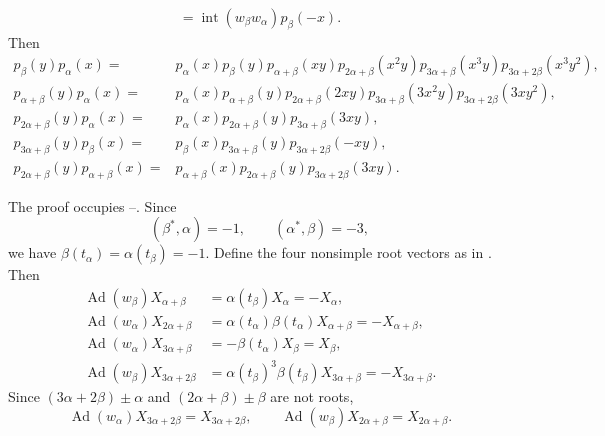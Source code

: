 {\begin{enumerate}
\[\begin{aligned}
          =\operatorname{int}(w_\beta w_\alpha)p_\beta(-x).
    \end{aligned}
    \]
    Then
    \[
    \begin{aligned}
      p_\beta(y)p_\alpha(x)
        ={}&p_\alpha(x)p_\beta(y)p_{\alpha+\beta}(xy)
          p_{2\alpha+\beta}(x^2y)p_{3\alpha+\beta}(x^3y)
          p_{3\alpha+2\beta}(x^3y^2),\\
      p_{\alpha+\beta}(y)p_\alpha(x)
        ={}&p_\alpha(x)p_{\alpha+\beta}(y)
          p_{2\alpha+\beta}(2xy)p_{3\alpha+\beta}(3x^2y)
          p_{3\alpha+2\beta}(3xy^2),\\
      p_{2\alpha+\beta}(y)p_\alpha(x)
        ={}&p_\alpha(x)p_{2\alpha+\beta}(y)
          p_{3\alpha+\beta}(3xy),\\
      p_{3\alpha+\beta}(y)p_\beta(x)
        ={}&p_\beta(x)p_{3\alpha+\beta}(y)
          p_{3\alpha+2\beta}(-xy),\\
      p_{2\alpha+\beta}(y)p_{\alpha+\beta}(x)
        ={}&p_{\alpha+\beta}(x)p_{2\alpha+\beta}(y)
          p_{3\alpha+2\beta}(3xy).
    \end{aligned}
    \]
\end{enumerate}}

The proof occupies --. Since
\[
  (\beta^*,\alpha)=-1,\qquad(\alpha^*,\beta)=-3,
\]
we have \(\beta(t_\alpha)=\alpha(t_\beta)=-1\). Define the four
nonsimple root vectors as in . Then
\[
\begin{aligned}
  \operatorname{Ad}(w_\beta)X_{\alpha+\beta}
    &=\alpha(t_\beta)X_\alpha=-X_\alpha,\\
  \operatorname{Ad}(w_\alpha)X_{2\alpha+\beta}
    &=\alpha(t_\alpha)\beta(t_\alpha)X_{\alpha+\beta}
      =-X_{\alpha+\beta},\\
  \operatorname{Ad}(w_\alpha)X_{3\alpha+\beta}
    &=-\beta(t_\alpha)X_\beta=X_\beta,\\
  \operatorname{Ad}(w_\beta)X_{3\alpha+2\beta}
    &=\alpha(t_\beta)^3\beta(t_\beta)X_{3\alpha+\beta}
      =-X_{3\alpha+\beta}.
\end{aligned}
\]
Since \((3\alpha+2\beta)\pm\alpha\) and
\((2\alpha+\beta)\pm\beta\) are not roots,
\[
  \operatorname{Ad}(w_\alpha)X_{3\alpha+2\beta}=X_{3\alpha+2\beta},
  \qquad
  \operatorname{Ad}(w_\beta)X_{2\alpha+\beta}=X_{2\alpha+\beta}.
\]

